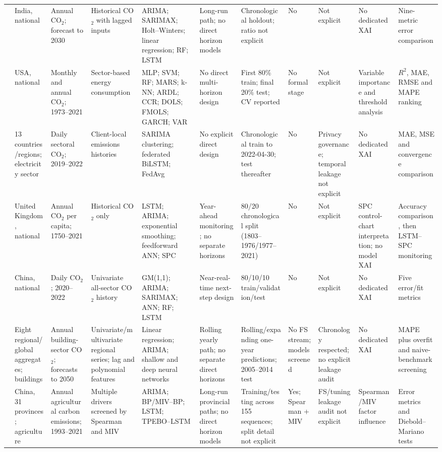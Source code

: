 \documentclass[preprint,12pt]{elsarticle}
\begin{document}
\begin{landscape}
\begin{longtable}{@{}P{1.60cm}P{1.45cm}P{1.55cm}P{2.05cm}P{2.00cm}P{1.35cm}P{1.75cm}P{1.35cm}P{1.65cm}P{1.70cm}P{1.90cm}@{}}
\citet{kumari2022} & India, national & Annual CO$_2$; forecast to 2030 & Historical CO$_2$ with lagged inputs & ARIMA; SARIMAX; Holt--Winters; linear regression; RF; LSTM & Long-run path; no direct horizon models & Chronological holdout; ratio not explicit & No & Not explicit & No dedicated XAI & Nine-metric error comparison \\
\citet{Ulussever2023CO2USA} & USA, national & Monthly and annual CO$_2$; 1973--2021 & Sector-based energy consumption & MLP; SVM; RF; MARS; k-NN; ARDL; CCR; DOLS; FMOLS; GARCH; VAR & No direct multi-horizon design & First 80\% train; final 20\% test; CV reported & No formal stage & Not explicit & Variable importance and threshold analysis & $R^2$, MAE, RMSE and MAPE ranking \\
\citet{Cui2023FederatedCarbon} & 13 countries/regions; electricity sector & Daily sectoral CO$_2$; 2019--2022 & Client-local emissions histories & SARIMA clustering; federated BiLSTM; FedAvg & No explicit direct design & Chronological train to 2022-04-30; test thereafter & No & Privacy governance; temporal leakage not explicit & No dedicated XAI & MAE, MSE and convergence comparison \\
\citet{Ezenkwu2024MonitoringCarbon} & United Kingdom, national & Annual CO$_2$ per capita; 1750--2021 & Historical CO$_2$ only & LSTM; ARIMA; exponential smoothing; feedforward ANN; SPC & Year-ahead monitoring; no separate horizons & 80/20 chronological split (1803--1976/1977--2021) & No & Not explicit & SPC control-chart interpretation; no model XAI & Accuracy comparison, then LSTM--SPC monitoring \\
\citet{LiZhang2023ChinaCO2} & China, national & Daily CO$_2$; 2020--2022 & Univariate all-sector CO$_2$ history & GM(1,1); ARIMA; SARIMAX; ANN; RF; LSTM & Near-real-time next-step design & 80/10/10 train/validation/test & No & Not explicit & No dedicated XAI & Five error/fit metrics \\
\citet{Giannelos2024BuildingCO2} & Eight regional/global aggregates; buildings & Annual building-sector CO$_2$; forecasts to 2050 & Univariate/\allowbreak multivariate regional series; lag and polynomial features & Linear regression; ARIMA; shallow and deep neural networks & Rolling yearly path; no separate direct horizons & Rolling/\allowbreak expanding one-year predictions; 2005--2014 test & No FS stream; models screened & Chronology respected; no explicit leakage audit & No dedicated XAI & MAPE plus overfit and naive-benchmark screening \\
\citet{Xie2024AgriculturalCarbon} & China, 31 provinces; agriculture & Annual agricultural carbon emissions; 1993--2021 & Multiple drivers screened by Spearman and MIV & ARIMA; BP/MIV--BP; LSTM; TPEBO--LSTM & Long-run provincial paths; no direct horizon models & Training/\allowbreak testing across 155 sequences; split detail not explicit & Yes; Spearman + MIV & FS/tuning leakage audit not explicit & Spearman/\allowbreak MIV factor influence & Error metrics and Diebold--Mariano tests \\

\end{longtable}
\end{landscape}
\end{document}
